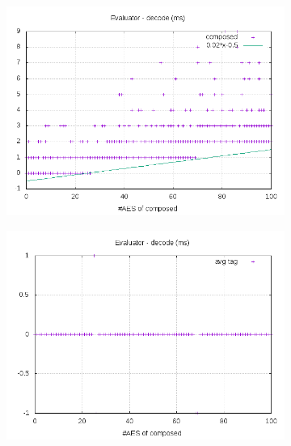 \documentclass[10pt,a4paper]{article}
\begin{document}
\begin{figure}[h]
    \begin{subfigure}[t]{0.3\textwidth}
        \includegraphics[width=\textwidth]{eval_decode_plots}
        \caption{}
        \label{data eval decode composed}
    \end{subfigure}
    \begin{subfigure}[t]{0.3\textwidth}
        \includegraphics[width=\textwidth]{eval_decode_avg}
        \caption{}
        \label{data eval decode tag}
    \end{subfigure}
    \begin{subfigure}[t]{0.3\textwidth}

\end{subfigure}
\end{figure}
\end{document}
